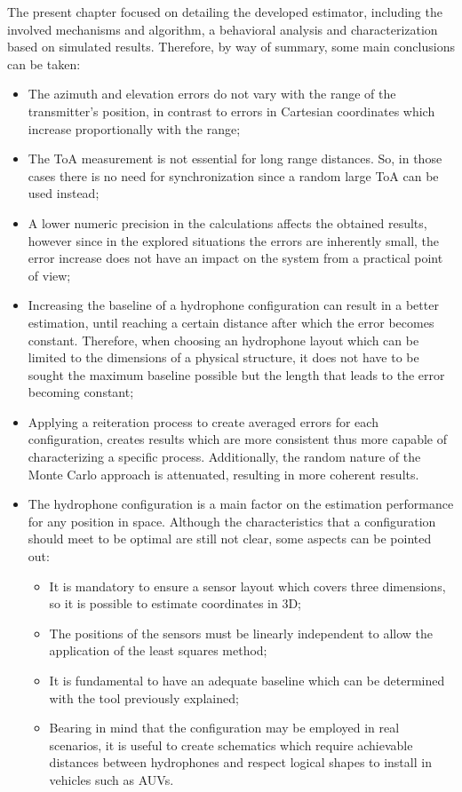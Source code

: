 The present chapter focused on detailing the developed estimator, including the involved mechanisms and algorithm, a behavioral analysis and characterization based on simulated results. Therefore, by way of summary, some main conclusions can be taken:
\begin{itemize}
	\item The azimuth and elevation errors do not vary with the range of the transmitter's position, in contrast to errors in Cartesian coordinates which increase proportionally with the range;
	
	\item The ToA measurement is not essential for long range distances. So, in those cases there is no need for synchronization since a random large ToA can be used instead;
		
	\item A lower numeric precision in the calculations affects the obtained results, however since in the explored situations the errors are inherently small, the error increase does not have an impact on the system from a practical point of view;
	
	\item Increasing the baseline of a hydrophone configuration can result in a better estimation, until reaching a certain distance after which the error becomes constant. Therefore, when choosing an hydrophone layout which can be limited to the dimensions of a physical structure, it does not have to be sought the maximum baseline possible but the length that leads to the error becoming constant;
	
	\item Applying a reiteration process to create averaged errors for each configuration, creates results which are more consistent thus more capable of characterizing a specific process. Additionally, the random nature of the Monte Carlo approach is attenuated, resulting in more coherent results.
	
	\item The hydrophone configuration is a main factor on the estimation performance for any position in space. Although the characteristics that a configuration should meet to be optimal are still not clear, some aspects can be pointed out: 
	
	\begin{itemize}
		\item It is mandatory to ensure a sensor layout which covers three dimensions, so it is possible to estimate coordinates in 3D;
		\item The positions of the sensors must be linearly independent to allow the application of the least squares method;
		\item It is fundamental to have an adequate baseline which can be determined with the tool previously explained;
		\item Bearing in mind that the configuration may be employed in real scenarios, it is useful to create schematics which require achievable distances between hydrophones and respect logical shapes to install in vehicles such as AUVs.
	\end{itemize}
\end{itemize}